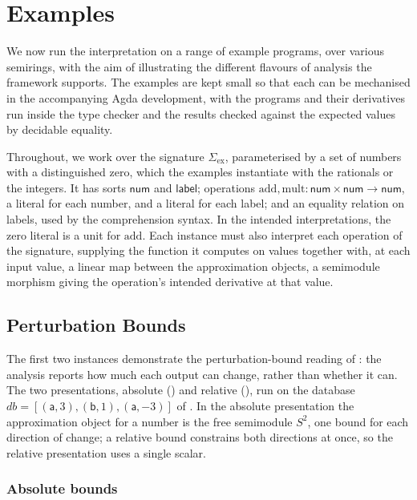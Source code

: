 \section{Examples}
\label{sec:examples}

We now run the interpretation on a range of example programs, over various semirings, with the aim
of illustrating the different flavours of analysis the framework supports. The examples are kept
small so that each can be mechanised in the accompanying Agda development, with the programs and their
derivatives run inside the type checker and the results checked against the expected values by decidable
equality.

Throughout, we work over the signature $\Sigma_{\mathrm{ex}}$, parameterised by a set
of numbers with a distinguished zero, which the examples instantiate with the rationals or the integers. It has sorts
$\mathsf{num}$ and $\mathsf{label}$; operations $\mathrm{add}, \mathrm{mult} : \mathsf{num} \times
\mathsf{num} \to \mathsf{num}$, a literal for each number, and a literal for each label; and an equality
relation on labels, used by the comprehension syntax. In the intended interpretations, the zero literal is a
unit for $\mathrm{add}$. Each instance must also interpret each operation of the signature, supplying the
function it computes on values together with, at each input value, a linear map between the approximation
objects, a semimodule morphism giving the operation's intended derivative at that value.

\subsection{Perturbation Bounds}
\label{sec:examples:perturbation-bounds}

The first two instances demonstrate the perturbation-bound reading of
: the analysis reports how much each output can change, rather
than whether it can. The two presentations, absolute () and relative
(), run on the database $\mathit{db} = [(\mathsf{a}, 3),
(\mathsf{b}, 1), (\mathsf{a}, -3)]$ of . In the absolute presentation the
approximation object for a number is the free semimodule $S^2$, one bound for each direction of change; a
relative bound constrains both directions at once, so the relative presentation uses a single scalar.

\subsubsection{Absolute bounds}
\label{sec:examples:absolute-bounds}

